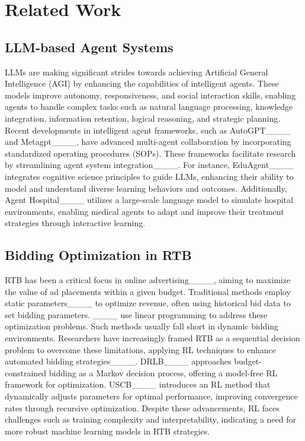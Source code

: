 \section{Related Work}
\subsection{LLM-based Agent Systems}
LLMs are making significant strides towards achieving Artificial General Intelligence (AGI) by enhancing the capabilities of intelligent agents. These models improve autonomy, responsiveness, and social interaction skills, enabling agents to handle complex tasks such as natural language processing, knowledge integration, information retention, logical reasoning, and strategic planning. Recent developments in intelligent agent frameworks, such as AutoGPT____ and Metagpt____, have advanced multi-agent collaboration by incorporating standardized operating procedures (SOPs). These frameworks facilitate research by streamlining agent system integration____. For instance, EduAgent____ integrates cognitive science principles to guide LLMs, enhancing their ability to model and understand diverse learning behaviors and outcomes. Additionally, Agent Hospital____ utilizes a large-scale language model to simulate hospital environments, enabling medical agents to adapt and improve their treatment strategies through interactive learning.  

\subsection{Bidding Optimization in RTB}
RTB has been a critical focus in online advertising____, aiming to maximize the value of ad placements within a given budget. Traditional methods employ static parameters____ to optimize revenue, often using historical bid data to set bidding parameters. ____ use linear programming to address these optimization problems. Such methods usually fall short in dynamic bidding environments. Researchers have increasingly framed RTB as a sequential decision problem to overcome these limitations, applying RL techniques to enhance automated bidding strategies____. DRLB____ approaches budget-constrained bidding as a Markov decision process, offering a model-free RL framework for optimization. USCB____ introduces an RL method that dynamically adjusts parameters for optimal performance, improving convergence rates through recursive optimization. Despite these advancements, RL faces challenges such as training complexity and interpretability, indicating a need for more robust machine learning models in RTB strategies.